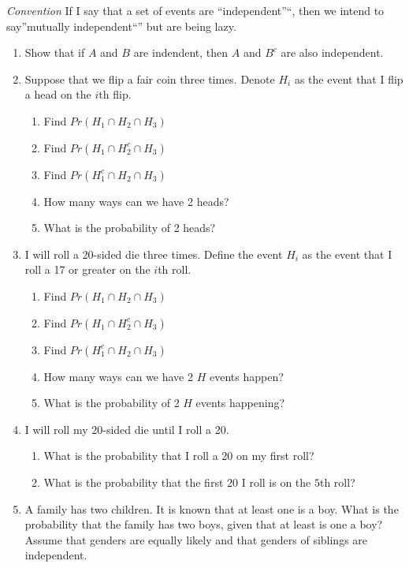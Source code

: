 \documentclass[]{book}
\providecommand{\tightlist}{%
  \setlength{\itemsep}{0pt}\setlength{\parskip}{0pt}}
\begin{document}
\emph{Convention} If I say that a set of events are ``independent''``,
then we intend to say''mutually independent``'' but are being lazy.

\begin{enumerate}
\def\labelenumi{\arabic{enumi}.}
\setcounter{enumi}{2}
\item
  Show that if \(A\) and \(B\) are indendent, then \(A\) and \(B^c\) are
  also independent.
\item
  Suppose that we flip a fair coin three times. Denote \(H_i\) as the
  event that I flip a head on the \(i\)th flip.

  \begin{enumerate}
  \def\labelenumii{\alph{enumii})}
  \tightlist
  \item
    Find \(Pr( H_1 \cap H_2 \cap H_3 )\)
  \item
    Find \(Pr( H_1 \cap H_2^c \cap H_3)\)
  \item
    Find \(Pr( H_1^c \cap H_2 \cap H_3)\)
  \item
    How many ways can we have 2 heads?
  \item
    What is the probability of 2 heads?
  \end{enumerate}
\item
  I will roll a 20-sided die three times. Define the event \(H_i\) as
  the event that I roll a 17 or greater on the \(i\)th roll.

  \begin{enumerate}
  \def\labelenumii{\alph{enumii})}
  \tightlist
  \item
    Find \(Pr( H_1 \cap H_2 \cap H_3 )\)
  \item
    Find \(Pr( H_1 \cap H_2^c \cap H_3)\)
  \item
    Find \(Pr( H_1^c \cap H_2 \cap H_3)\)
  \item
    How many ways can we have 2 \(H\) events happen?
  \item
    What is the probability of 2 \(H\) events happening?
  \end{enumerate}
\item
  I will roll my 20-sided die until I roll a 20.

  \begin{enumerate}
  \def\labelenumii{\alph{enumii})}
  \tightlist
  \item
    What is the probability that I roll a 20 on my first roll?
  \item
    What is the probability that the first 20 I roll is on the \(5\)th
    roll?
  \end{enumerate}
\item
  A family has two children. It is known that at least one is a boy.
  What is the probability that the family has two boys, given that at
  least is one a boy? Assume that genders are equally likely and that
  genders of siblings are independent.
\end{enumerate}
\end{document}

